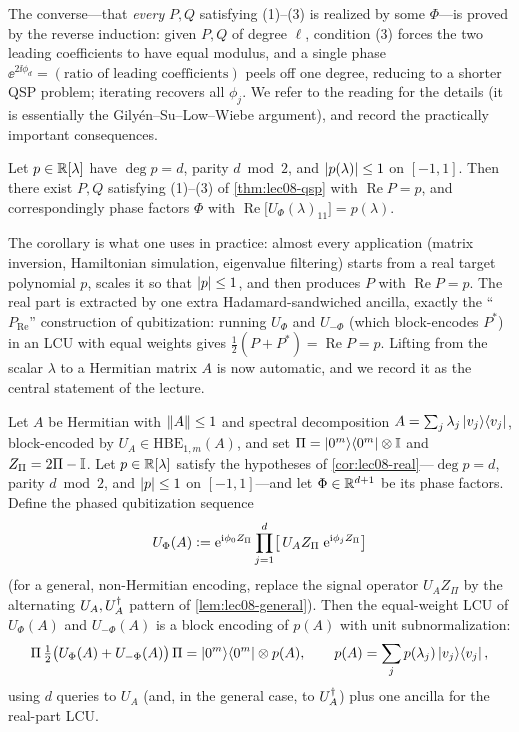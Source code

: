 The converse---that \emph{every} $P,Q$ satisfying (1)--(3) is realized by some
$\Phi$---is proved by the reverse induction: given $P,Q$ of degree $\ell$, condition
(3) forces the two leading coefficients to have equal modulus, and a single phase
$\ee^{2\ii\phi_d}=(\text{ratio of leading coefficients})$ peels off one degree,
reducing to a shorter QSP problem; iterating recovers all $\phi_j$. We refer to the
reading for the details (it is essentially the Gily\'en--Su--Low--Wiebe argument),
and record the practically important consequences.

\begin{corollary}
\label{cor:lec08-real}
Let $p\in\mathbb{R}[\lambda]$ have $\deg p=d$, parity $d\bmod2$, and $\left\lvert p(\lambda) \right\rvert\le1$
on $[-1,1]$. Then there exist $P,Q$ satisfying \textup{(1)--(3)} of
\cref{thm:lec08-qsp} with $\operatorname{Re}P=p$, and correspondingly phase factors
$\Phi$ with $\operatorname{Re}\!\bigl[U_\Phi(\lambda)_{11}\bigr]=p(\lambda)$.
\end{corollary}

The corollary is what one uses in practice: almost every application (matrix
inversion, Hamiltonian simulation, eigenvalue filtering) starts from a real target
polynomial $p$, scales it so that $\left\lvert p \right\rvert\le1$, and then produces $P$ with
$\operatorname{Re}P=p$. The real part is extracted by one extra Hadamard-sandwiched
ancilla, exactly the ``$P_{\mathrm{Re}}$'' construction of qubitization: running
$U_\Phi$ and $U_{-\Phi}$ (which block-encodes $P^*$) in an LCU with equal weights
gives $\tfrac12(P+P^*)=\operatorname{Re}P=p$. Lifting from the scalar $\lambda$ to a
Hermitian matrix $A$ is now automatic, and we record it as the central statement of the
lecture.

\begin{proposition}
\label{prop:lec08-qet}
Let $A$ be Hermitian with $\left\lVert A \right\rVert\le1$ and spectral decomposition
$A=\sum_{j}\lambda_j\ket{v_j}\!\bra{v_j}$, block-encoded by $U_A\in\mathrm{HBE}_{1,m}(A)$, and set
$\Pi=\ket{0^m}\!\bra{0^m}\otimes\mathbb{I}$ and $Z_\Pi=2\Pi-\mathbb{I}$. Let $p\in\mathbb{R}[\lambda]$ satisfy the
hypotheses of \cref{cor:lec08-real}---$\deg p=d$, parity $d\bmod2$, and $\left\lvert p \right\rvert\le1$ on
$[-1,1]$---and let $\Phi\in\mathbb{R}^{d+1}$ be its phase factors. Define the phased
qubitization sequence
\begin{equation}
  U_\Phi(A)\vcentcolon=\mathrm{e}^{\mathrm{i}\phi_0 Z_\Pi}\prod_{j=1}^{d}
     \bigl[\,U_A Z_\Pi\;\mathrm{e}^{\mathrm{i}\phi_j Z_\Pi}\bigr]
  \label{eq:lec08-UphiA}
\end{equation}
(for a general, non-Hermitian encoding, replace the signal operator $U_A Z_\Pi$ by the
alternating $U_A,U_A^{\dagger}$ pattern of \cref{lem:lec08-general}). Then the equal-weight LCU
of $U_\Phi(A)$ and $U_{-\Phi}(A)$ is a block encoding of $p(A)$ with unit
subnormalization:
\begin{equation}
  \Pi\,\tfrac12\bigl(U_\Phi(A)+U_{-\Phi}(A)\bigr)\,\Pi
    =\ket{0^m}\!\bra{0^m}\otimes p(A),\qquad
  p(A)=\sum_{j}p(\lambda_j)\ket{v_j}\!\bra{v_j},
  \label{eq:lec08-qetblock}
\end{equation}
using $d$ queries to $U_A$ (and, in the general case, to $U_A^{\dagger}$) plus one ancilla for
the real-part LCU.
\end{proposition}

